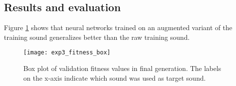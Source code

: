 \subsection{Results and evaluation}
Figure \ref{fig:exp3_fitness_box} shows that neural networks trained on an augmented variant of the training sound generalizes better than the raw training sound.


\begin{figure}[H]
    \centering
    \texttt{[image: exp3\_fitness\_box]}
    \caption{Box plot of validation fitness values in final generation. The labels on the x-axis indicate which sound was used as target sound.}
    \label{fig:exp3_fitness_box}
\end{figure}
